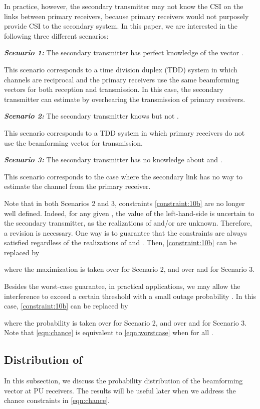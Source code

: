 \documentclass[twocolumn,10pt]{IEEEtran}
\theoremstyle{plain} \newtheorem{theorem}{Theorem}
\theoremstyle{plain} \newtheorem{proposition}{Proposition}
\theoremstyle{plain} \newtheorem{corollary}{Corollary}
\theoremstyle{remark} \newtheorem{remark}{Remark}
\theoremstyle{remark} \newtheorem{lemma}{Lemma}
\theoremstyle{plain} \newtheorem{definition}{Definition}
\theoremstyle{plain} \newtheorem{assumption}{Assumption}
\theoremstyle{plain} \newtheorem{fact}{Fact}
\begin{document}
In practice, however, the secondary transmitter may not know the CSI on the links between primary receivers, because primary receivers would not purposely provide CSI to the secondary system. In this paper, we are interested in the following three different scenarios:

\noindent \emph{\textbf{Scenario 1:}} The secondary transmitter has perfect knowledge of the vector .

This scenario corresponds to a time division duplex (TDD) system in which channels are reciprocal and the primary receivers use the same beamforming vectors for both reception and transmission. In this case, the secondary transmitter can estimate  by overhearing the transmission of primary receivers.

\noindent \emph{\textbf{Scenario 2:}} The secondary transmitter knows  but not .

This scenario corresponds to a TDD system in which primary receivers do not use the beamforming vector  for transmission.

\noindent \emph{\textbf{Scenario 3:}} The secondary transmitter has no knowledge about  and .

This scenario corresponds to the case where the secondary link has no way to estimate the channel from the primary receiver.

Note that in both Scenarios 2 and 3, constraints \eqref{constraint:10b} are no longer well defined. Indeed, for any given , the value of the left-hand-side is uncertain to the secondary transmitter, as the realizations of  and/or  are unknown. Therefore, a revision is necessary. One way is to guarantee that the constraints are always satisfied regardless of the realizations of  and . Then, \eqref{constraint:10b} can be replaced by

where the maximization is taken over  for Scenario 2, and over  and  for Scenario 3.

Besides the worst-case guarantee, in practical applications, we may allow the interference to exceed a certain threshold  with a small outage probability . In this case, \eqref{constraint:10b} can be replaced by

where the probability is taken over  for Scenario 2, and over  and  for Scenario 3.  Note that \eqref{eqn:chance} is equivalent to \eqref{eqn:worstcase} when  for all .

\subsection{Distribution of }
In this subsection, we discuss the probability distribution of the beamforming vector  at PU receivers. The results will be useful later when we address the chance constraints in \eqref{eqn:chance}.
\end{document}

